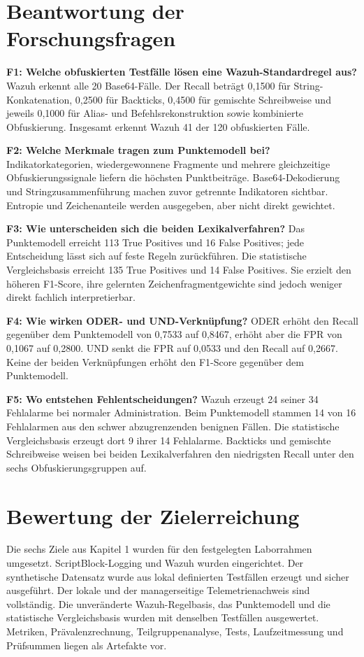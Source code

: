 \documentclass[12pt,a4paper,oneside,parskip=half]{scrreprt}
\begin{document}
\section{Beantwortung der Forschungsfragen}
\textbf{F1: Welche obfuskierten Testfälle lösen eine Wazuh-Standardregel aus?} Wazuh erkennt alle 20 Base64-Fälle. Der Recall beträgt 0{,}1500 für String-Konkatenation, 0{,}2500 für Backticks, 0{,}4500 für gemischte Schreibweise und jeweils 0{,}1000 für Alias- und Befehlsrekonstruktion sowie kombinierte Obfuskierung. Insgesamt erkennt Wazuh 41 der 120 obfuskierten Fälle.

\textbf{F2: Welche Merkmale tragen zum Punktemodell bei?} Indikatorkategorien, wiedergewonnene Fragmente und mehrere gleichzeitige Obfuskierungssignale liefern die höchsten Punktbeiträge. Base64-Dekodierung und Stringzusammenführung machen zuvor getrennte Indikatoren sichtbar. Entropie und Zeichenanteile werden ausgegeben, aber nicht direkt gewichtet.

\textbf{F3: Wie unterscheiden sich die beiden Lexikalverfahren?} Das Punktemodell erreicht 113 True Positives und 16 False Positives; jede Entscheidung lässt sich auf feste Regeln zurückführen. Die statistische Vergleichsbasis erreicht 135 True Positives und 14 False Positives. Sie erzielt den höheren F1-Score, ihre gelernten Zeichenfragmentgewichte sind jedoch weniger direkt fachlich interpretierbar.

\textbf{F4: Wie wirken ODER- und UND-Verknüpfung?} ODER erhöht den Recall gegenüber dem Punktemodell von 0{,}7533 auf 0{,}8467, erhöht aber die FPR von 0{,}1067 auf 0{,}2800. UND senkt die FPR auf 0{,}0533 und den Recall auf 0{,}2667. Keine der beiden Verknüpfungen erhöht den F1-Score gegenüber dem Punktemodell.

\textbf{F5: Wo entstehen Fehlentscheidungen?} Wazuh erzeugt 24 seiner 34 Fehlalarme bei normaler Administration. Beim Punktemodell stammen 14 von 16 Fehlalarmen aus den schwer abzugrenzenden benignen Fällen. Die statistische Vergleichsbasis erzeugt dort 9 ihrer 14 Fehlalarme. Backticks und gemischte Schreibweise weisen bei beiden Lexikalverfahren den niedrigsten Recall unter den sechs Obfuskierungsgruppen auf.
\section{Bewertung der Zielerreichung}
Die sechs Ziele aus Kapitel 1 wurden für den festgelegten Laborrahmen umgesetzt. ScriptBlock-Logging und Wazuh wurden eingerichtet. Der synthetische Datensatz wurde aus lokal definierten Testfällen erzeugt und sicher ausgeführt. Der lokale und der managerseitige Telemetrienachweis sind vollständig. Die unveränderte Wazuh-Regelbasis, das Punktemodell und die statistische Vergleichsbasis wurden mit denselben Testfällen ausgewertet. Metriken, Prävalenzrechnung, Teilgruppenanalyse, Tests, Laufzeitmessung und Prüfsummen liegen als Artefakte vor.
\end{document}
